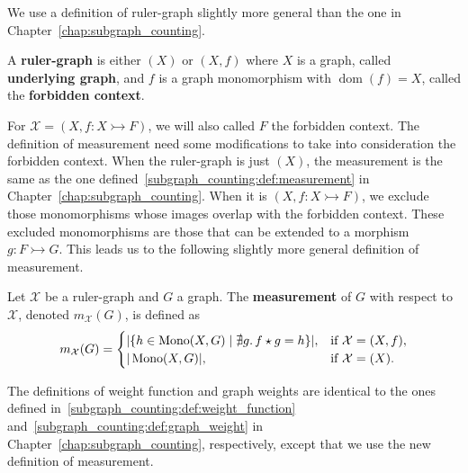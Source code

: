 
We use a definition of ruler-graph slightly more general than the one in Chapter~\ref{chap:subgraph_counting}.

\begin{definition}
    \label{antipattern:def:ruler_graph}
    A \textbf{ruler-graph} is either $(X)$ or \( (X, f) \) where $X$ is a graph, called \textbf{underlying graph}, and $f$ is a graph monomorphism with $\operatorname{dom}(f) = X$, called the \textbf{forbidden context}.
\end{definition}
For $\mathcal{X} = (X, f:X \rightarrowtail F)$, we will also called $F$ the forbidden context. The definition of measurement need some modifications to take into consideration the forbidden context. When the ruler-graph is just $(X)$, the measurement is the same as the one defined~\autoref{subgraph_counting:def:measurement} in Chapter~\ref{chap:subgraph_counting}. When it is $(X, f:X \rightarrowtail F)$, we exclude those monomorphisms whose images overlap with the forbidden context. These excluded monomorphisms are those that can be extended to a morphism $g: F \rightarrowtail G$. This leads us to the following slightly more general definition of measurement.
\begin{definition}[Measurement]
    \label{antipattern:def:measurement}
    Let \( \mathcal{X}\) be a ruler-graph and \( G \) a graph. The \textbf{measurement} of \( G \) with respect to \( \mathcal{X}\), denoted \( m_\mathcal{X}(G) \), is defined as 
    \[
        m_\mathcal{X}(G) =
        \begin{cases}
            |\{h \in \operatorname{Mono}(X,G) \mid \nexists g.\,f \star g = h \}|, & \text{if } \mathcal{X} = (X, f), \\
            |\operatorname{Mono}(X,G)|, & \text{if } \mathcal{X} = (X).
        \end{cases}
    \]
\end{definition}
The definitions of weight function and graph weights are identical to the ones defined in~\autoref{subgraph_counting:def:weight_function} and~\autoref{subgraph_counting:def:graph_weight} in Chapter~\ref{chap:subgraph_counting}, respectively, except that we use the new definition of measurement.